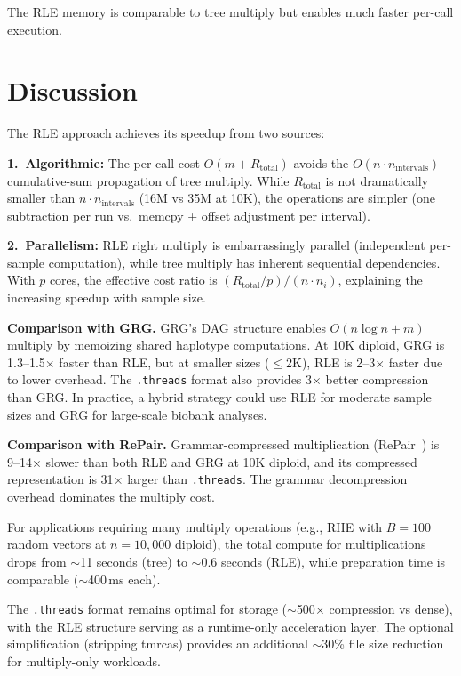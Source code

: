 \documentclass[11pt]{article}
\begin{document}
The RLE memory is comparable to tree multiply but enables much faster
per-call execution.

\section{Discussion}

The RLE approach achieves its speedup from two sources:

\textbf{1.\ Algorithmic:} The per-call cost $O(m + R_\text{total})$ avoids
the $O(n \cdot n_\text{intervals})$ cumulative-sum propagation of tree
multiply.  While $R_\text{total}$ is not dramatically smaller than $n
\cdot n_\text{intervals}$ (16M vs 35M at 10K), the operations are simpler
(one subtraction per run vs.\ memcpy + offset adjustment per interval).

\textbf{2.\ Parallelism:} RLE right multiply is embarrassingly parallel
(independent per-sample computation), while tree multiply has inherent
sequential dependencies.  With $p$ cores, the effective cost ratio is
$(R_\text{total}/p) / (n \cdot n_i)$, explaining the increasing speedup
with sample size.

\textbf{Comparison with GRG.}  GRG's DAG structure enables $O(n \log n + m)$
multiply by memoizing shared haplotype computations.  At 10K diploid, GRG
is 1.3--1.5$\times$ faster than RLE, but at smaller sizes ($\le$2K),
RLE is 2--3$\times$ faster due to lower overhead.  The \texttt{.threads}
format also provides 3$\times$ better compression than GRG.  In practice,
a hybrid strategy could use RLE for moderate sample sizes and GRG for
large-scale biobank analyses.

\textbf{Comparison with RePair.}  Grammar-compressed multiplication
(RePair~\cite{tosoni2022}) is 9--14$\times$ slower than both RLE and GRG at
10K diploid, and its compressed representation is 31$\times$ larger than
\texttt{.threads}.  The grammar decompression overhead dominates the
multiply cost.

For applications requiring many multiply operations (e.g., RHE with
$B = 100$ random vectors at $n = 10{,}000$ diploid), the total compute
for multiplications drops from $\sim$11 seconds (tree) to $\sim$0.6 seconds
(RLE), while preparation time is comparable ($\sim$400\,ms each).

The \texttt{.threads} format remains optimal for storage ($\sim$500$\times$
compression vs dense), with the RLE structure serving as a runtime-only
acceleration layer.  The optional simplification (stripping tmrcas) provides
an additional $\sim$30\% file size reduction for multiply-only workloads.
\end{document}
